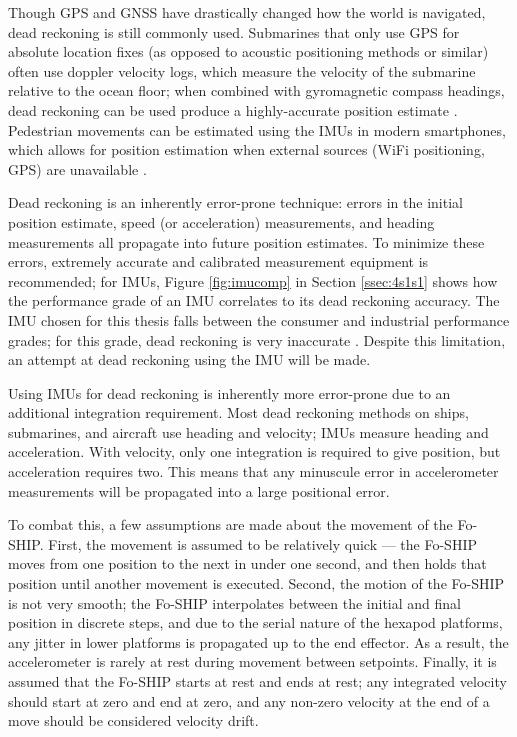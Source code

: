 \documentclass[11pt]{ucthesisCP}
\begin{document}
Though GPS and GNSS have drastically changed how the world is navigated, dead reckoning is still commonly used. Submarines that only use GPS for absolute location fixes (as opposed to acoustic positioning methods or similar) often use doppler velocity logs, which measure the velocity of the submarine relative to the ocean floor; when combined with gyromagnetic compass headings, dead reckoning can be used produce a highly-accurate position estimate \cite{surveyurpn}. Pedestrian movements can be estimated using the IMUs in modern smartphones, which allows for position estimation when external sources (WiFi positioning, GPS) are unavailable \cite{sfcomp} \cite{madgstep}. 

Dead reckoning is an inherently error-prone technique: errors in the initial position estimate, speed (or acceleration) measurements, and heading measurements all propagate into future position estimates. To minimize these errors, extremely accurate and calibrated measurement equipment is recommended; for IMUs, Figure \ref{fig:imucomp} in Section \ref{ssec:4s1s1} shows how the performance grade of an IMU correlates to its dead reckoning accuracy. The IMU chosen for this thesis falls between the consumer and industrial performance grades; for this grade, dead reckoning is very inaccurate \cite{imuadvnav}. Despite this limitation, an attempt at dead reckoning using the IMU will be made.

Using IMUs for dead reckoning is inherently more error-prone due to an additional integration requirement. Most dead reckoning methods on ships, submarines, and aircraft use heading and velocity; IMUs measure heading and acceleration. With velocity, only one integration is required to give position, but acceleration requires two. This means that any minuscule error in accelerometer measurements will be propagated into a large positional error.

To combat this, a few assumptions are made about the movement of the Fo-SHIP. First, the movement is assumed to be relatively quick --- the Fo-SHIP moves from one position to the next in under one second, and then holds that position until another movement is executed. Second, the motion of the Fo-SHIP is not very smooth; the Fo-SHIP interpolates between the initial and final position in discrete steps, and due to the serial nature of the hexapod platforms, any jitter in lower platforms is propagated up to the end effector. As a result, the accelerometer is rarely at rest during movement between setpoints. Finally, it is assumed that the Fo-SHIP starts at rest and ends at rest; any integrated velocity should start at zero and end at zero, and any non-zero velocity at the end of a move should be considered velocity drift.
\end{document}
